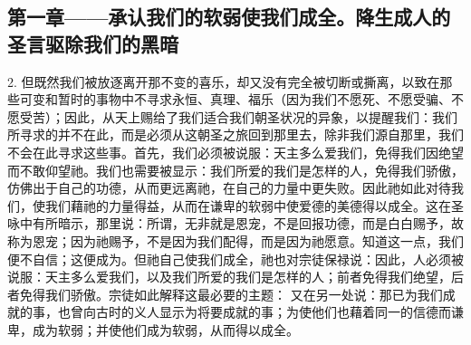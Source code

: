 
\subsection{第一章——承认我们的软弱使我们成全。降生成人的圣言驱除我们的黑暗}

2. 但既然我们被放逐离开那不变的喜乐，却又没有完全被切断或撕离，以致在那些可变和暂时的事物中不寻求永恒、真理、福乐（因为我们不愿死、不愿受骗、不愿受苦）；因此，从天上赐给了我们适合我们朝圣状况的异象，以提醒我们：我们所寻求的并不在此，而是必须从这朝圣之旅回到那里去，除非我们源自那里，我们不会在此寻求这些事。首先，我们必须被说服：天主多么爱我们，免得我们因绝望而不敢仰望祂。我们也需要被显示：我们所爱的我们是怎样的人，免得我们骄傲，仿佛出于自己的功德，从而更远离祂，在自己的力量中更失败。因此祂如此对待我们，使我们藉祂的力量得益，从而在谦卑的软弱中使爱德的美德得以成全。这在圣咏中有所暗示，那里说：所谓，无非就是恩宠，不是回报功德，而是白白赐予，故称为恩宠；因为祂赐予，不是因为我们配得，而是因为祂愿意。知道这一点，我们便不自信；这便成为。但祂自己使我们成全，祂也对宗徒保禄说：因此，人必须被说服：天主多么爱我们，以及我们所爱的我们是怎样的人；前者免得我们绝望，后者免得我们骄傲。宗徒如此解释这最必要的主题：  又在另一处说：那已为我们成就的事，也曾向古时的义人显示为将要成就的事；为使他们也藉着同一的信德而谦卑，成为软弱；并使他们成为软弱，从而得以成全。\par

